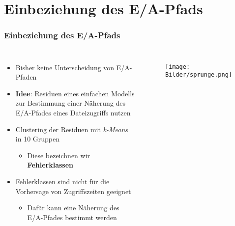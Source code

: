 \documentclass{beamer}
\begin{document}
\section{Einbeziehung des E/A-Pfads}
\begin{frame}
\frametitle{Einbeziehung des E/A-Pfads}
\begin{columns}
\begin{itemize}
	\item Bisher keine Unterscheidung von E/A-Pfaden
	\item \textbf{Idee}: Residuen eines einfachen Modells zur Bestimmung einer Näherung des E/A-Pfades eines Dateizugriffs nutzen
	\item Clustering der Residuen mit \textit{k-Means} in 10 Gruppen
	\begin{itemize}
		\item Diese bezeichnen wir \textbf{Fehlerklassen} 
	\end{itemize}
	\item Fehlerklassen sind nicht für die Vorhersage von Zugriffszeiten geeignet
	\begin{itemize}
		\item Dafür kann eine Näherung des E/A-Pfades bestimmt werden
	\end{itemize}
\end{itemize}
	\begin{figure}
		\texttt{[image: Bilder/sprunge.png]}\\
	\end{figure}
\end{columns}
\end{frame}
\end{document}
